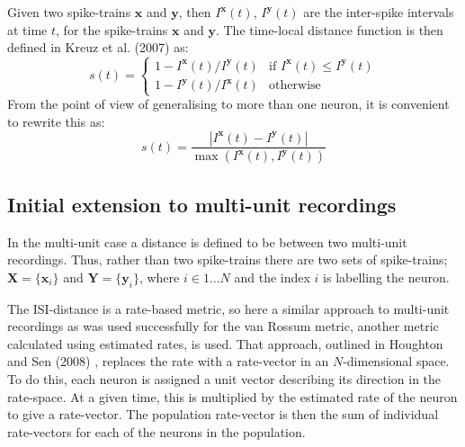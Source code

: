 Given two spike-trains $\mathbf{x}$ and $\mathbf{y}$, then $I^{\mathbf{x}}(t)$, $I^{\mathbf{y}}(t)$ are the inter-spike intervals at time $t$, for the spike-trains $\mathbf{x}$ and $\mathbf{y}$.  The time-local distance function is then defined in Kreuz et al. (2007) as:
\begin{equation}
s(t) = \left\{ \begin{array}{ll} 1-I^{\mathbf{x}}(t) / I^{\mathbf{y}}(t)  & \text{if } I^{\mathbf{x}}(t) \leq I^{\mathbf{y}}(t) \\ 1- I^{\mathbf{y}}(t) / I^{\mathbf{x}}(t)  & \text{otherwise} \end{array} \right.
\end{equation}
From the point of view of generalising to more than one neuron, it is convenient to rewrite this as:
\begin{equation}
s(t) = \frac{ | I^{\mathbf{x}}(t) - I^{\mathbf{y}}(t) | }{\max (I^{\mathbf{x}}(t), I^{\mathbf{y}}(t)) }
\end{equation}

\subsection{Initial extension to multi-unit recordings}

In the multi-unit case a distance is defined to be between two multi-unit recordings.  Thus, rather than two spike-trains there are two sets of spike-trains; $\mathbf{X}=\{ \mathbf{x}_i \}$ and $ \mathbf{Y}=\{ \mathbf{y}_i \}$, where $i \in 1\ldots N$ and the index $i$ is labelling the neuron.

The ISI-distance is a rate-based metric, so here a similar approach to multi-unit recordings as was used successfully for the van Rossum metric, another metric calculated using estimated rates, is used.  That approach, outlined in Houghton and Sen (2008) \cite{HoughtonSen2008}, replaces the rate with a rate-vector in an $N$-dimensional space.  To do this, each neuron is assigned a unit vector describing its direction in the rate-space.  At a given time, this is multiplied by the estimated rate of the neuron to give a rate-vector. The population rate-vector is then the sum of individual rate-vectors for each of the neurons in the population.  

